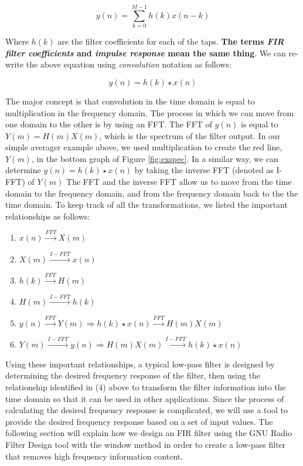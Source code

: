 $$y(n) = \sum_{k=0}^{M-1}  h(k)x(n-k)$$

Where $h(k)$ are the filter coefficients for each of the taps.
\textbf{The terms \textit{FIR filter coefficients} and \textit{impulse response}
mean the same thing}\cite{lyons:intro}. We can re-write the above
equation using \textit{convolution} notation as follows:

$$y(n) = h(k) \star x(n)$$  

The major concept is that convolution in the time domain is equal
to multiplication in the frequency domain. The process in which we can
move from one domain to the other is by using an FFT. The FFT of $y(n)$ is equal
to $Y(m) = H(m) X(m)$, which is the spectrum of the filter
output. In our simple averager example above, we used
multiplication to create the red line, $Y(m)$, in the bottom
graph of Figure \ref{fig:exspec}. In a similar way, we can
determine $y(n) = h(k)\star x(n)$ by taking the inverse FFT
(denoted as I-FFT) of $Y(m)$ \cite{lyons:intro} The FFT and the
inverse FFT allow us to move from the time domain to the
frequency domain, and from the frequency domain back to the the
time domain. To keep track of all the transformations, we listed
the important relationships as follows: \\

\begin{enumerate}
\item $x(n) \overset{FFT}{\longrightarrow} X(m)$
\item $X(m) \overset{I-FFT}{\longrightarrow} x(n)$
\item $h(k) \overset{FFT}{\longrightarrow} H(m)$
\item $H(m) \overset{I-FFT}{\longrightarrow} h(k)$
\item $y(n) \overset{FFT}{\longrightarrow} Y(m) \Rightarrow h(k)\star x(n) \overset{FFT}{\longrightarrow} H(m) X(m)$
\item $Y(m) \overset{I-FFT}{\longrightarrow} y(n) \Rightarrow H(m) X(m) \overset{I-FFT}{\longrightarrow} h(k)\star x(n)$\\
\end{enumerate}    

Using these important relationships, a typical low-pass filter is designed by determining the desired frequency response of the filter, then using the relationship identified in (4) above to transform the filter information into the time domain so that it can be used in other applications.  Since the process of calculating the desired frequency response is complicated, we will use a tool to provide the desired frequency response based on a set of input values.  The following section will explain how we design an FIR filter
using the GNU Radio Filter Design tool with the window method in
order to create a low-pass filter that removes high frequency
information content. 

